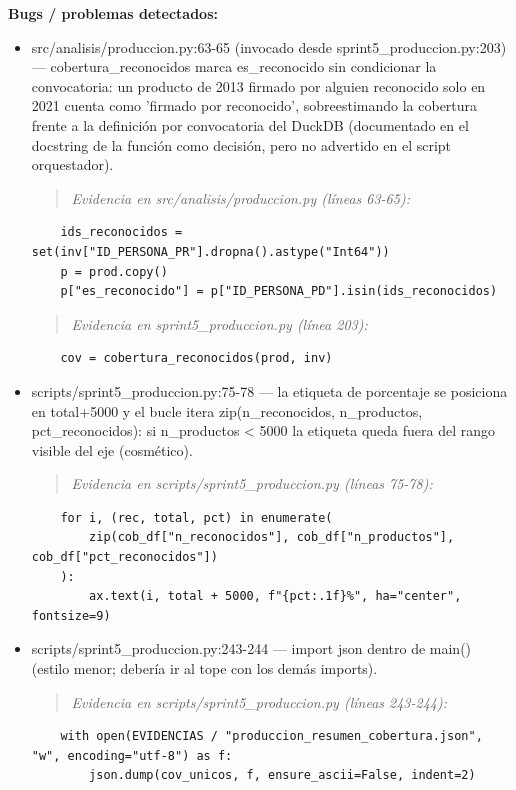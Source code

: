 \begin{tcolorbox}[riesgo]
\textbf{Bugs / problemas detectados:}
\begin{itemize}
  \item src/analisis/produccion.py:63-65 (invocado desde sprint5\_produccion.py:203) --- cobertura\_reconocidos marca es\_reconocido sin condicionar la convocatoria: un producto de 2013 firmado por alguien reconocido solo en 2021 cuenta como 'firmado por reconocido', sobreestimando la cobertura frente a la definición por convocatoria del DuckDB (documentado en el docstring de la función como decisión, pero no advertido en el script orquestador).
\begin{quote}\footnotesize\ttfamily
\noindent\emph{Evidencia en src/analisis/produccion.py (líneas 63-65):}
\end{quote}
\begin{lstlisting}
    ids_reconocidos = set(inv["ID_PERSONA_PR"].dropna().astype("Int64"))
    p = prod.copy()
    p["es_reconocido"] = p["ID_PERSONA_PD"].isin(ids_reconocidos)
\end{lstlisting}

\begin{quote}\footnotesize\ttfamily
\noindent\emph{Evidencia en sprint5\_produccion.py (línea 203):}
\end{quote}
\begin{lstlisting}
    cov = cobertura_reconocidos(prod, inv)
\end{lstlisting}

  \item scripts/sprint5\_produccion.py:75-78 --- la etiqueta de porcentaje se posiciona en total+5000 y el bucle itera zip(n\_reconocidos, n\_productos, pct\_reconocidos): si n\_productos < 5000 la etiqueta queda fuera del rango visible del eje (cosmético).
\begin{quote}\footnotesize\ttfamily
\noindent\emph{Evidencia en scripts/sprint5\_produccion.py (líneas 75-78):}
\end{quote}
\begin{lstlisting}
    for i, (rec, total, pct) in enumerate(
        zip(cob_df["n_reconocidos"], cob_df["n_productos"], cob_df["pct_reconocidos"])
    ):
        ax.text(i, total + 5000, f"{pct:.1f}%", ha="center", fontsize=9)
\end{lstlisting}

  \item scripts/sprint5\_produccion.py:243-244 --- import json dentro de main() (estilo menor; debería ir al tope con los demás imports).
\begin{quote}\footnotesize\ttfamily
\noindent\emph{Evidencia en scripts/sprint5\_produccion.py (líneas 243-244):}
\end{quote}
\begin{lstlisting}
    with open(EVIDENCIAS / "produccion_resumen_cobertura.json", "w", encoding="utf-8") as f:
        json.dump(cov_unicos, f, ensure_ascii=False, indent=2)
\end{lstlisting}


\end{itemize}
\end{tcolorbox}
